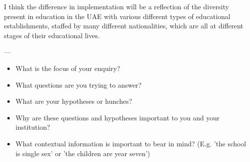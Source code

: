 I think the difference in implementation will be a reflection of the diversity present in education in the UAE with various different types of educational establishments, staffed by many different nationalities, which are all at different stages of their educational lives.

---
\begin{itemize}

\item  What is the focus of your enquiry?
\item What questions are you trying to answer?
\item What are your hypotheses or hunches?
\item Why are these questions and hypotheses important to you and your institution?
\item What contextual information is important to bear in mind? (E.g. 'the school is single sex' or 'the children are year seven')

\end{itemize}